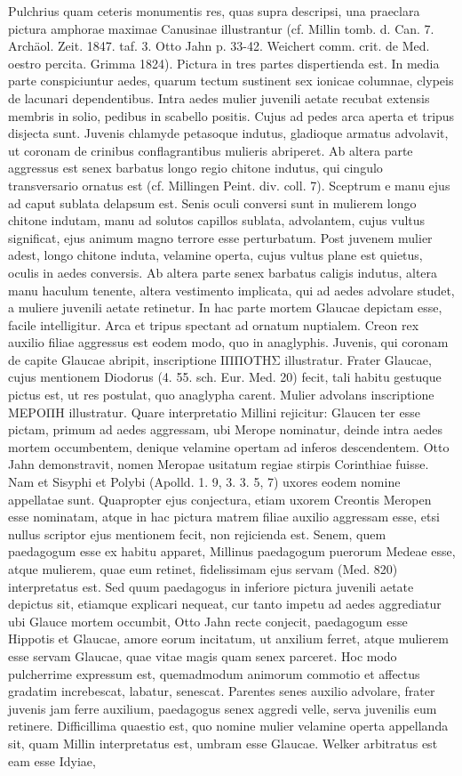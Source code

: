 \documentclass[landscape, a4paper, 11pt, oneside, polutonikogreek, german]{article}
\begin{document}
Pulchrius quam ceteris monumentis res, quas supra descripsi, una praeclara pictura amphorae maximae Canusinae illustrantur (cf. Millin tomb. d. Can. 7. Archäol. Zeit. 1847. taf. 3. Otto Jahn p. 33-42. Weichert comm. crit. de Med. oestro percita. Grimma 1824). Pictura in tres partes dispertienda est. In media parte conspiciuntur aedes, quarum tectum sustinent sex ionicae columnae, clypeis de lacunari dependentibus. Intra aedes mulier juvenili aetate recubat extensis membris in solio, pedibus in scabello positis. Cujus ad pedes arca aperta et tripus disjecta sunt. Juvenis chlamyde petasoque indutus, gladioque armatus advolavit, ut coronam de crinibus conflagrantibus mulieris abriperet. Ab altera parte aggressus est senex barbatus longo regio chitone indutus, qui cingulo transversario ornatus est (cf. Millingen Peint. div. coll. 7). Sceptrum e manu ejus ad caput sublata delapsum est. Senis oculi conversi sunt in mulierem longo chitone indutam, manu ad solutos capillos sublata, advolantem, cujus vultus significat, ejus animum magno terrore esse perturbatum. Post juvenem mulier adest, longo chitone induta, velamine operta, cujus vultus plane est quietus, oculis in aedes conversis. Ab altera parte senex barbatus caligis indutus, altera manu haculum tenente, altera vestimento implicata, qui ad aedes advolare studet, a muliere juvenili aetate retinetur. In hac parte mortem Glaucae depictam esse, facile intelligitur. Arca et tripus spectant ad ornatum nuptialem. Creon rex auxilio filiae aggressus est eodem modo, quo in anaglyphis. Juvenis, qui coronam de capite Glaucae abripit, inscriptione ΙΠΠΟΤΗΣ illustratur. Frater Glaucae, cujus mentionem Diodorus (4. 55. sch. Eur. Med. 20) fecit, tali habitu gestuque pictus est, ut res postulat, quo anaglypha carent. Mulier advolans inscriptione ΜΕΡΟΠΗ illustratur. Quare interpretatio Millini rejicitur: Glaucen ter esse pictam, primum ad aedes aggressam, ubi Merope nominatur, deinde intra aedes mortem occumbentem, denique velamine opertam ad inferos descendentem. Otto Jahn demonstravit, nomen Meropae usitatum regiae stirpis Corinthiae fuisse. Nam et Sisyphi et Polybi (Apolld. 1. 9, 3. 3. 5, 7) uxores eodem nomine appellatae sunt. Quapropter ejus conjectura, etiam uxorem Creontis Meropen esse nominatam, atque in hac pictura matrem filiae auxilio aggressam esse, etsi nullus scriptor ejus mentionem fecit, non rejicienda est. Senem, quem paedagogum esse ex habitu apparet, Millinus paedagogum puerorum Medeae esse, atque mulierem, quae eum retinet, fidelissimam ejus servam (Med. 820) interpretatus est. Sed quum paedagogus in inferiore pictura juvenili aetate depictus sit, etiamque explicari nequeat, cur tanto impetu ad aedes aggrediatur ubi Glauce mortem occumbit, Otto Jahn recte conjecit, paedagogum esse Hippotis et Glaucae, amore eorum incitatum, ut anxilium ferret, atque mulierem esse servam Glaucae, quae vitae magis quam senex parceret. Hoc modo pulcherrime expressum est, quemadmodum animorum commotio et affectus gradatim increbescat, labatur, senescat. Parentes senes auxilio advolare, frater juvenis jam ferre auxilium, paedagogus senex aggredi velle, serva juvenilis eum retinere. Difficillima quaestio est, quo nomine mulier velamine operta appellanda sit, quam Millin interpretatus est, umbram esse Glaucae. Welker arbitratus est eam esse Idyiae, 
\end{document}
